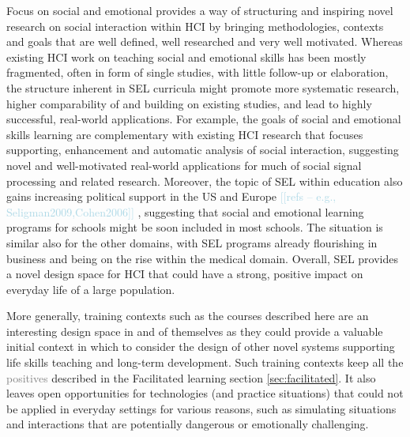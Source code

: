\documentclass[prodmode,acmtochi]{acmsmall}
\newcommand{\todo}[1]{\textrm{\textrm{\textcolor{LightBlue}{[[#1]]} } } }
\newcommand{\rephrase}[1]{\textrm{\textrm{\textcolor{gray}{#1}}}}
\begin{document}
Focus on social and emotional provides a way of structuring and inspiring novel research on social interaction within HCI by bringing methodologies, contexts and goals that are well defined, well researched and very well motivated. Whereas existing HCI work on teaching social and emotional skills has been mostly fragmented, often in form of single studies, with little follow-up or elaboration, the structure inherent in SEL curricula might promote more systematic research, higher comparability of and building on existing studies, and lead to highly successful, real-world applications. 
%
For example, the goals of social and emotional skills learning are complementary with existing HCI research that focuses supporting, enhancement and automatic analysis of social interaction, suggesting novel and well-motivated real-world applications for much of social signal processing and related research. 
%
Moreover, the topic of SEL within education also gains increasing political support in the US and Europe \todo{refs -- e.g., Seligman2009,Cohen2006}, suggesting that social and emotional learning programs for schools might be soon included in most schools. The situation is similar also for the other domains, with SEL programs already flourishing in business and being on the rise within the medical domain. Overall, SEL provides a novel design space for HCI that could have a strong, positive impact on everyday life of a large population. 

More generally, training contexts such as the courses described here are an interesting design space in and of themselves as they could provide a valuable initial context in which to consider the design of other novel systems supporting life skills teaching and long-term development. Such training contexts keep all the \rephrase{positives} described in the Facilitated learning section \ref{sec:facilitated}. It also leaves open opportunities for technologies (and practice situations) that could not be applied in everyday settings for various reasons, such as simulating situations and interactions that are potentially dangerous or emotionally challenging.





\end{document}
